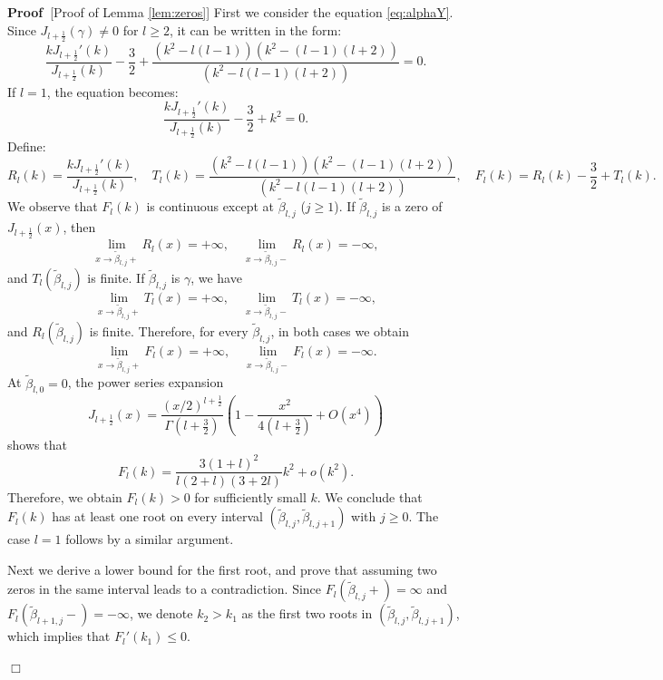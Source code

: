 \documentclass[11pt,a4paper]{article}
\numberwithin{equation}{section}
\newenvironment{proof}{\noindent\textbf{Proof\ }}{\hspace*{\fill}$\Box$\medskip}
\begin{document}
\begin{proof}[Proof of Lemma \ref{lem:zeros}]
  First we consider the equation \eqref{eq:alphaY}. Since $J_{l + \frac{1}{2}}
  (\gamma) \neq 0$ for $l \geqslant 2$, it can be written in the form:
  \[ \frac{kJ_{l + \frac{1}{2}}' (k)}{J_{l + \frac{1}{2}} (k)} - \frac{3}{2} +
     \frac{(k^2 - l (l - 1))  (k^2 - (l - 1) (l + 2))}{(k^2 - l (l - 1) (l +
     2))} = 0. \]
  If $l = 1$, the equation becomes:
  \[ \frac{kJ_{l + \frac{1}{2}}' (k)}{J_{l + \frac{1}{2}} (k)} - \frac{3}{2} +
     k^2 = 0. \]
  Define:
  \[ R_l (k) = \frac{kJ_{l + \frac{1}{2}}' (k)}{J_{l + \frac{1}{2}} (k)},
     \quad T_l (k) = \frac{(k^2 - l (l - 1))  (k^2 - (l - 1) (l + 2))}{(k^2 -
     l (l - 1) (l + 2))}, \quad F_l (k) = R_l (k) - \frac{3}{2} + T_l (k) . \]
  We observe that $F_l (k)$ is continuous except at $\tilde{\beta}_{l, j}$ ($j
  \geqslant 1$). If $\tilde{\beta}_{l, j}$ is a zero of $J_{l + \frac{1}{2}}
  (x)$, then
  \[ \lim_{x \rightarrow \tilde{\beta}_{l, j} +} R_l (x) = + \infty, \quad
     \lim_{x \rightarrow \tilde{\beta}_{l, j} -} R_l (x) = - \infty, \]
  and $T_l (\tilde{\beta}_{l, j})$ is finite. If $\tilde{\beta}_{l, j}$ is
  $\gamma$, we have
  \[ \lim_{x \rightarrow \tilde{\beta}_{l, j} +} T_l (x) = + \infty, \quad
     \lim_{x \rightarrow \tilde{\beta}_{l, j} -} T_l (x) = - \infty, \]
  and $R_l (\tilde{\beta}_{l, j})$ is finite. Therefore, for every
  $\tilde{\beta}_{l, j}$, in both cases we obtain 
  \[ \lim_{x \rightarrow \tilde{\beta}_{l, j} +} F_l (x) = + \infty, \quad
     \lim_{x \rightarrow \tilde{\beta}_{l, j} -} F_l (x) = - \infty . \]
  At $\tilde{\beta}_{l, 0} = 0$, the power series
  expansion
  \[ J_{l + \frac{1}{2}} (x) = \frac{(x / 2)^{l + \frac{1}{2}}}{\Gamma (l +
     \frac{3}{2})}  (1 - \frac{x^2}{4 (l + \frac{3}{2})} + O (x^4)) \]
  shows that
  \[ F_l (k) = \frac{3 (1 + l)^2}{l (2 + l)  (3 + 2 l)} k^2 + o (k^2) . \]
  Therefore, we obtain $F_l (k) > 0$ for sufficiently small $k$. We conclude that $F_l
  (k)$ has at least one root on every interval $(\tilde{\beta}_{l, j},
  \tilde{\beta}_{l, j + 1})$ with $j \geqslant 0$. The case $l = 1$ follows by
  a similar argument.
  
  Next we derive a lower bound for the first root, and prove that assuming two
  zeros in the same interval leads to a contradiction. Since $F_l 
  (\tilde{\beta}_{l, j} +) = \infty$ and $F_l  (\tilde{\beta}_{l + 1, j} -) =
  - \infty$, we denote $k_2 > k_1$ as the first two roots in
  $(\tilde{\beta}_{l, j}, \tilde{\beta}_{l, j + 1})$, which implies that $F_l'
  (k_1) \leqslant 0$.
  

\end{proof}
\end{document}
